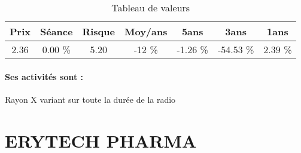 \documentclass[11pt,a4paper]{report}%
\begin{document}
\begin{table}[H]
  \centering
    \begin{tabular}{|c|c|c|c|c|c|c|}
    \hline
    Prix & Séance & Risque  & Moy/ans & 5ans & 3ans & 1ans \\
    \hline
    2.36 &    0.00 \%    & 5.20 & -12 \% & -1.26 \% & -54.53 \% & 2.39 \% \\
    \hline
    \end{tabular}%
        \label{tab:table_EOS IMAGING}%
      \caption{Tableau de valeurs}
\end{table}%

\paragraph{Ses activités sont : } Rayon X variant sur toute la durée de la radio 
    
    \newpage

\section{ERYTECH PHARMA}
\end{document}
